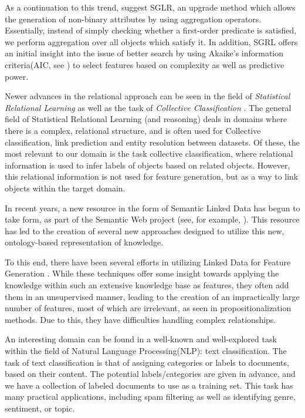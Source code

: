 \documentclass[12pt, a4paper]{article}
\theoremstyle{definition}
\begin{document}
As a continuation to this trend, \citet{popescul200716} suggest SGLR, an upgrade method which allows the generation of non-binary attributes by using aggregation operators. Essentially, instead of simply checking whether a first-order predicate is satisfied, we perform aggregation over all objects which satisfy it. In addition, SGRL offers an initial insight into the issue of better search by using Akaike's information criteria(AIC, see \citet{burnham2002model}) to select features based on complexity as well as predictive power.

Newer advances in the relational approach can be seen in the field of \emph{Statistical Relational Learning} \citep{blockeel2013statistical, nath2014learning} as well as the task of \emph{Collective Classification} \citep{kajdanowicz2013collective, laorden2012collective}. The general field of Statistical Relational Learning (and reasoning) deals in domains where there is a complex, relational structure, and is often used for Collective classification, link prediction and entity resolution between datasets. Of these, the most relevant to our domain is the task collective classification, where relational information is used to infer labels of objects based on related objects. However, this relational information is not used for feature generation, but as a way to link objects within the target domain.

In recent years, a new resource in the form of Semantic Linked Data has begun to take form, as part of the Semantic Web project (see, for example, \citet{bizer2009linked}). This resource has led to the creation of several new approaches designed to utilize this new, ontology-based representation of knowledge\citep{losch2012graph,rios2014statistical}. 

To this end, there have been several efforts in utilizing Linked Data for Feature Generation \citep{cheng2011automated, paulheim2012unsupervised}. While these techniques offer some insight towards applying the knowledge within such an extensive knowledge base as features, they often add them in an unsupervised manner, leading to the creation of an impractically large number of features, most of which are irrelevant, as seen in propositionalization methods. Due to this, they have difficulties handling complex relationships.


An interesting domain can be found in a well-known and well-explored task within the field of Natural Language Processing(NLP): text classification.
The task of text classification is that of assigning categories or labels to documents, based on their content. The potential labels/categories are given in advance, and we have a collection of labeled documents to use as a training set. This task has many practical applications, including spam filtering as well as identifying genre, sentiment, or topic.
\end{document}
